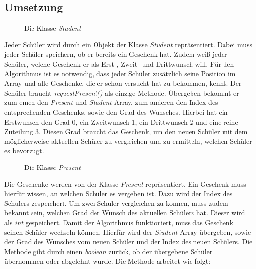 \documentclass[a4paper, 12pt]{scrartcl}
\begin{document}
\subsection{Umsetzung}

\begin{figure}[h]
    \centering
    \caption{Die Klasse \emph{Student}}
\end{figure}

Jeder Schüler wird durch ein Objekt der Klasse \emph{Student} repräsentiert. Dabei muss jeder Schüler speichern, ob er bereits ein Geschenk hat. Zudem weiß jeder Schüler, welche Geschenk er als Erst-, Zweit- und Drittwunsch will. Für den Algorithmus ist es notwendig, dass jeder Schüler zusätzlich seine Position im Array und alle Geschenke, die er schon versucht hat zu bekommen, kennt. Der Schüler braucht \emph{requestPresent()} als einzige Methode. Übergeben bekommt er zum einen den \emph{Present} und \emph{Student} Array, zum anderen den Index des entsprechenden Geschenks, sowie den Grad des Wunsches. Hierbei hat ein Erstwunsch den Grad 0, ein Zweitwunsch 1, ein Drittwunsch 2 und eine reine Zuteilung 3. Diesen Grad braucht das Geschenk, um den neuen Schüler mit dem möglicherweise aktuellen Schüler zu vergleichen und zu ermitteln, welchen Schüler es bevorzugt.

\begin{figure}[h]
    \centering
    \caption{Die Klasse \emph{Present}}
\end{figure}

Die Geschenke werden von der Klasse \emph{Present} repräsentiert. Ein Geschenk muss hierfür wissen, an welchen Schüler es vergeben ist. Dazu wird der Index des Schülers gespeichert. Um zwei Schüler vergleichen zu können, muss zudem bekannt sein, welchen Grad der Wunsch des aktuellen Schülers hat. Dieser wird als \emph{int} gespeichert. Damit der Algorithmus funktioniert, muss das Geschenk seinen Schüler wechseln können. Hierfür wird der \emph{Student} Array übergeben, sowie der Grad des Wunsches vom neuen Schüler und der Index des neuen Schülers. Die Methode gibt durch einen \emph{boolean} zurück, ob der übergebene Schüler übernommen oder abgelehnt wurde. Die Methode arbeitet wie folgt:
\end{document}
